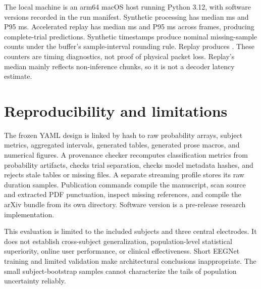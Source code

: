 \documentclass[11pt]{article}
\begin{document}
\begin{table}[t]
\centering
\caption{Local software-processing profile. Synthetic mode uses actual BrainFlow synthetic acquisition. Replay is accelerated held-out PhysioNet trial delivery through the CSP decoder. Times cover source read through frame construction and exclude network transport and browser rendering. Frames are the measured software-processing calls, not independent trials.}
\label{tab:streaming}
\end{table}
The local machine is an arm64 macOS host running Python 3.12, with software versions recorded in the run manifest. Synthetic processing has median \SyntheticPipelineMedian{} ms and P95 \SyntheticPipelinePninetyfive{} ms. Accelerated replay has median \ReplayPipelineMedian{} ms and P95 \ReplayPipelinePninetyfive{} ms across \ReplayFrames{} frames, producing \ReplayPredictions{} complete-trial predictions. Synthetic timestamps produce \SyntheticGaps{} nominal missing-sample counts under the buffer's sample-interval rounding rule. Replay produces \ReplayGaps{}. These counters are timing diagnostics, not proof of physical packet loss. Replay's median mainly reflects non-inference chunks, so it is not a decoder latency estimate.

\section{Reproducibility and limitations}
The frozen YAML design is linked by hash to raw probability arrays, subject metrics, aggregated intervals, generated tables, generated prose macros, and numerical figures. A provenance checker recomputes classification metrics from probability artifacts, checks trial separation, checks model metadata hashes, and rejects stale tables or missing files. A separate streaming profile stores its raw duration samples. Publication commands compile the manuscript, scan source and extracted PDF punctuation, inspect missing references, and compile the arXiv bundle from its own directory. Software version \SoftwareVersion{} is a pre-release research implementation.

This evaluation is limited to the included subjects and three central electrodes. It does not establish cross-subject generalization, population-level statistical superiority, online user performance, or clinical effectiveness. Short EEGNet training and limited validation make architectural conclusions inappropriate. The small subject-bootstrap samples cannot characterize the tails of population uncertainty reliably.
\end{document}
